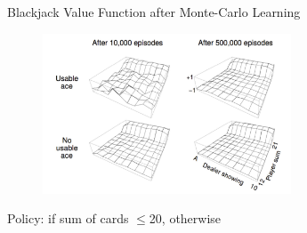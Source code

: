 \bgroup
\begin{frame}{Blackjack Value Function after Monte-Carlo Learning}
\begin{figure}
\centering
\includegraphics[width=0.657\textwidth]{img/blackjack_value.pdf}
\end{figure}
Policy:  if sum of cards $\leq$20, otherwise 
\end{frame}
\egroup